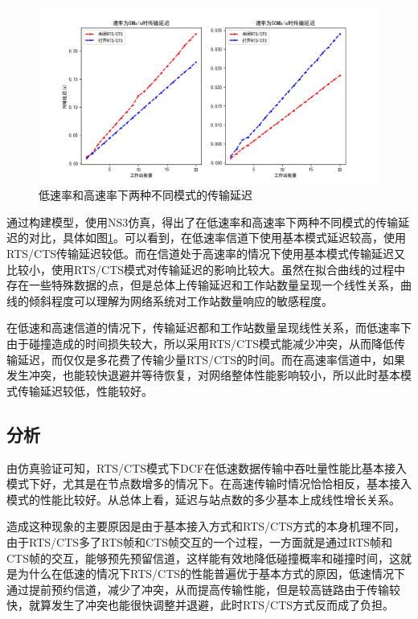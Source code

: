 \documentclass{article}
\begin{document}
\begin{figure}[ht]
	\centering
	\includegraphics[scale=0.6]{picture/delay.png}
	\caption{低速率和高速率下两种不同模式的传输延迟}
	\label{fig:delay}
\end{figure}
通过构建模型，使用NS3仿真，得出了在低速率和高速率下两种不同模式的传输延迟的对比，具体如图\ref{fig:delay}。可以看到，在低速率信道下使用基本模式延迟较高，使用RTS/CTS传输延迟较低。而在信道处于高速率的情况下使用基本模式传输延迟又比较小，使用RTS/CTS模式对传输延迟的影响比较大。虽然在拟合曲线的过程中存在一些特殊数据的点，但是总体上传输延迟和工作站数量呈现一个线性关系，曲线的倾斜程度可以理解为网络系统对工作站数量响应的敏感程度。

在低速和高速信道的情况下，传输延迟都和工作站数量呈现线性关系，而低速率下由于碰撞造成的时间损失较大，所以采用RTS/CTS模式能减少冲突，从而降低传输延迟，而仅仅是多花费了传输少量RTS/CTS的时间。而在高速率信道中，如果发生冲突，也能较快退避并等待恢复，对网络整体性能影响较小，所以此时基本模式传输延迟较低，性能较好。
\subsection{分析}

由仿真验证可知，RTS/CTS模式下DCF在低速数据传输中吞吐量性能比基本接入模式下好，尤其是在节点数增多的情况下。在高速传输时情况恰恰相反，基本接入模式的性能比较好。从总体上看，延迟与站点数的多少基本上成线性增长关系。

造成这种现象的主要原因是由于基本接入方式和RTS/CTS方式的本身机理不同，由于RTS/CTS多了RTS帧和CTS帧交互的一个过程，一方面就是通过RTS帧和CTS帧的交互，能够预先预留信道，这样能有效地降低碰撞概率和碰撞时间，这就是为什么在低速的情况下RTS/CTS的性能普遍优于基本方式的原因，低速情况下通过提前预约信道，减少了冲突，从而提高传输性能，但是较高链路由于传输较快，就算发生了冲突也能很快调整并退避，此时RTS/CTS方式反而成了负担。
\end{document}
